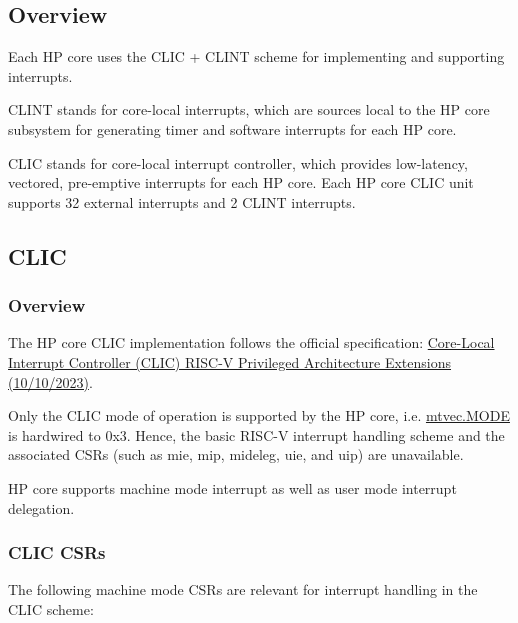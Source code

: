 \documentclass[main\_\_EN.tex]{subfiles}
\begin{document}

\subsection{Overview}
\label{sec:riscvcpu-intr-overview}

Each HP core uses the CLIC + CLINT scheme for implementing and supporting interrupts.

CLINT stands for core-local interrupts, which are sources local to the HP core subsystem for generating timer and software interrupts for each HP core.

CLIC stands for core-local interrupt controller, which provides low-latency, vectored, pre-emptive interrupts for each HP core. Each HP core CLIC unit supports 32 external interrupts and 2 CLINT interrupts.


\subsection{CLIC}
\label{sec:riscvcpu-clic}

\subsubsection{Overview}
\label{sec:riscvcpu-clic-overview}

The HP core CLIC implementation follows the official specification: \href{https://github.com/riscv/riscv-fast-interrupt/blob/v0.10/src/clic.adoc}{Core-Local Interrupt Controller (CLIC) RISC-V Privileged Architecture Extensions (10/10/2023)}.

Only the CLIC mode of operation is supported by the HP core, i.e. \hyperref[fielddesc:MTVECMODE]{mtvec.MODE} is hardwired to 0x3. Hence, the basic RISC-V interrupt handling scheme and the associated CSRs (such as mie, mip, mideleg, uie, and uip) are unavailable.

HP core supports machine mode interrupt as well as user mode interrupt delegation.

\subsubsection{CLIC CSRs}
\label{sec:riscvcpu-clic-csrs}

The following machine mode CSRs are relevant for interrupt handling in the CLIC scheme:
\end{document}
